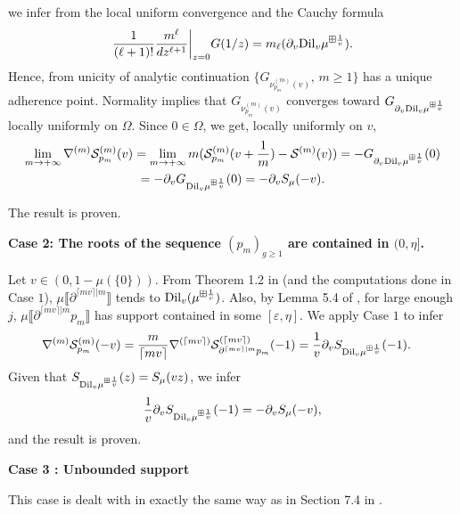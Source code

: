 \documentclass[12pt,reqno]{amsart}
\newcommand{\ceil}[1]{\lceil {#1} \rceil}
\begin{document}
	we infer from the local uniform convergence and the Cauchy formula
	$$
		\frac{1}{(\ell+1)!}\frac{m^{\ell}}{dz^{\ell+1}}\biggr|_{z=0}G(1/z) = m_{\ell}(\partial_v {\rm Dil}_v\mu^{\boxplus \frac{1}{v}}).
	$$
	Hence, from unicity of analytic continuation $\{G_{\nu^{(m)}_{p_m}(v)},\, m \geq 1\}$ has a unique adherence point. Normality implies that $G_{\nu^{(m)}_{p_m}(v)}$ converges toward $G_{\partial_v {\rm Dil}_v\mu^{\boxplus \frac{1}{v}}}$ locally uniformly on $\Omega$.
    Since $0 \in \Omega$, we get, locally uniformly on $v$,
    \begin{multline*}
\lim_{m\rightarrow+\infty}\nabla^{(m)}\mathcal{S}^{(m)}_{p_m}(v) = \lim_{m\rightarrow+\infty}m(\mathcal{S}^{(m)}_{p_m}(v + \frac{1}{m}) - \mathcal{S}^{(m)}(v)) = -G_{\partial_v {\rm Dil}_v\mu^{\boxplus \frac{1}{v}}}(0)\\=-\partial_v G_{{\rm Dil}_v\mu^{\boxplus \frac{1}{v}}}(0) = -\partial_v {S}_{\mu}(-v).   
    \end{multline*}
    
	The result is proven.
	\newline

	\textbf{Case 2: The roots of the sequence $(p_m)_{g\geq 1}$ are contained in $(0,\eta]$.} \newline
    
    Let $v \in (0,1-\mu(\{0\}))$.
	From Theorem 1.2 in \cite{arizmendi2024s} (and the computations done in Case $1$), $\mu \llbracket \partial^{\ceil{mv} | m}\rrbracket$
	tends to ${\rm Dil}_{v}(\mu^{\boxplus \frac{1}{v}})$. Also, by Lemma 5.4 of \cite{arizmendi2024s}, for large enough $j$, $\mu \llbracket \partial^{\ceil{mv}|m} p_m\rrbracket $
	has support contained in some $[\varepsilon, \eta]$. We apply Case $1$ to infer 
	\begin{align}
	&\nabla^{(m)} \mathcal{S}^{(m)}_{p_m}(-v) =  \frac{m}{\ceil{mv}}\nabla^{(\ceil{mv})} \mathcal{S}^{(\ceil{mv})}_{\partial^{\ceil{mv}|m}p_m} (-1) 
	= \frac{1}{v}\partial_v  S_{{\rm Dil}_v \mu^{\boxplus \frac{1}{v}}}(-1). 
	\end{align}
	Given that $S_{{\rm Dil}_v \mu^{\boxplus \frac{1}{v}}}(z) = S_{\mu}(vz) $, we infer 
	$$
	\frac{1}{v}\partial_v  S_{{\rm Dil}_v \mu^{\boxplus \frac{1}{v}}}(-1) = -\partial_v  S_{\mu}(-v),
	$$
	and the result is proven.
	\newline

	\textbf{Case 3 : Unbounded support} 
    \newline

    This case is dealt with in exactly the same way as in Section 7.4 in \cite{arizmendi2024s}.
\end{document}

